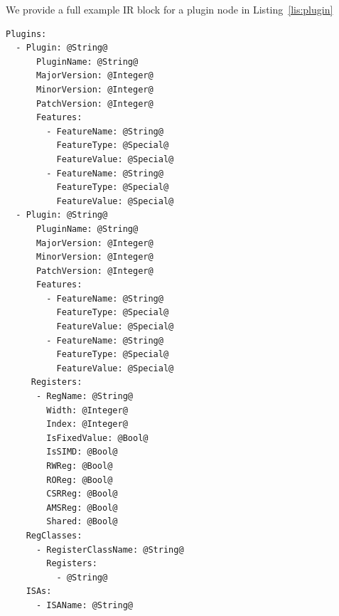 \documentclass{article}
\begin{document}
We provide a full example IR block for a plugin node in Listing~\ref{lis:plugin}

\vspace{0.125in}
\begin{lstlisting}[frame=single,style=base,caption={Plugin Node Definition},captionpos=b,label={lis:plugin}]
Plugins:
  - Plugin: @String@
      PluginName: @String@
      MajorVersion: @Integer@
      MinorVersion: @Integer@
      PatchVersion: @Integer@
      Features:
        - FeatureName: @String@
          FeatureType: @Special@
          FeatureValue: @Special@
        - FeatureName: @String@
          FeatureType: @Special@
          FeatureValue: @Special@
  - Plugin: @String@
      PluginName: @String@
      MajorVersion: @Integer@
      MinorVersion: @Integer@
      PatchVersion: @Integer@
      Features:
        - FeatureName: @String@
          FeatureType: @Special@
          FeatureValue: @Special@
        - FeatureName: @String@
          FeatureType: @Special@
          FeatureValue: @Special@
     Registers:
      - RegName: @String@
        Width: @Integer@
        Index: @Integer@
        IsFixedValue: @Bool@
        IsSIMD: @Bool@
        RWReg: @Bool@
        ROReg: @Bool@
        CSRReg: @Bool@
        AMSReg: @Bool@
        Shared: @Bool@
    RegClasses:
      - RegisterClassName: @String@
        Registers:
          - @String@
    ISAs:
      - ISAName: @String@
\end{lstlisting}





\clearpage
\end{document}
